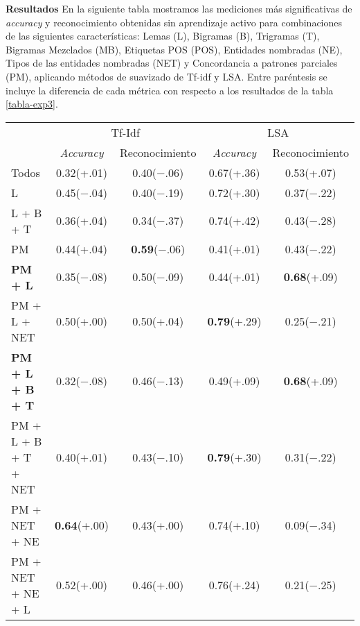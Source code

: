 \vspace{3 mm}

\textbf{Resultados} En la siguiente tabla mostramos las mediciones más significativas de \textit{accuracy} y reconocimiento obtenidas sin aprendizaje activo para combinaciones de las siguientes características: Lemas (L), Bigramas (B), Trigramas (T), Bigramas Mezclados (MB), Etiquetas POS (POS), Entidades nombradas (NE), Tipos de las entidades nombradas (NET) y Concordancia a patrones parciales (PM), aplicando métodos de suavizado de Tf-idf y LSA. Entre paréntesis se incluye la diferencia de cada métrica con respecto a los resultados de la tabla \ref{tabla-exp3}.

\begin{table}[h]\label{tabla-exp4}
\centering
\begin{tabular}{l c c | c c}
     & \multicolumn{2}{c|}{Tf-Idf} & \multicolumn{2}{c}{LSA}\\ [0.5ex]
     & \textit{Accuracy} & Reconocimiento & \textit{Accuracy} & Reconocimiento \\ [0.5ex]
    \hline
    Todos & 0.32(+.01) & 0.40($-$.06) & 0.67(+.36) & 0.53(+.07) \\[0.5ex]
    L & 0.45($-$.04) & 0.40($-$.19) & 0.72(+.30) & 0.37($-$.22) \\[0.5ex]
    L + B + T & 0.36(+.04) & 0.34($-$.37) & 0.74(+.42) & 0.43($-$.28) \\[0.5ex]
    PM & 0.44(+.04) & \textbf{0.59}($-$.06) & 0.41(+.01) & 0.43($-$.22) \\[0.5ex]
    \textbf{PM + L} & 0.35($-$.08) & 0.50($-$.09) & 0.44(+.01) & \textbf{0.68}(+.09) \\[0.5ex]
    PM + L + NET & 0.50(+.00) & 0.50(+.04) & \textbf{0.79}(+.29) & 0.25($-$.21)\\[0.5ex]
    \textbf{PM + L + B + T} & 0.32($-$.08) & 0.46($-$.13) & 0.49(+.09) & \textbf{0.68}(+.09) \\[0.5ex]
    PM + L + B + T + NET & 0.40(+.01) & 0.43($-$.10) & \textbf{0.79}(+.30) & 0.31($-$.22) \\[0.5ex]
    PM + NET + NE & \textbf{0.64}(+.00) & 0.43(+.00) & 0.74(+.10) & 0.09($-$.34) \\[0.5ex]
    PM + NET + NE + L & 0.52(+.00) & 0.46(+.00) & 0.76(+.24) & 0.21($-$.25) \\[0.5ex]
    \hline

\end{tabular}
\end{table}
